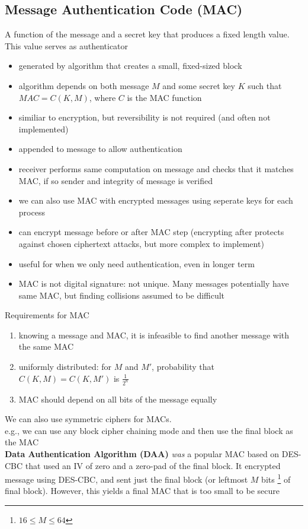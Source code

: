 \documentclass{article}
\begin{document}
\subsection{Message Authentication Code (MAC)}
A function of the message and a secret key that produces a fixed length value. This value serves as authenticator
\begin{itemize}
    \item generated by algorithm that creates a small, fixed-sized block
    \item algorithm depends on both message $M$ and some secret key $K$ such that $MAC = C(K,M)$, where $C$ is the MAC function
    \item similiar to encryption, but reversibility is not required (and often not implemented)
    \item appended to message to allow authentication
    \item receiver performs same computation on message and checks that it matches MAC, if so sender and integrity of message is verified
    \item we can also use MAC with encrypted messages using seperate keys for each process
    \item can encrypt message before or after MAC step (encrypting after protects against chosen ciphertext attacks, but more complex to implement)
    \item useful for when we only need authentication, even in longer term
    \item MAC is not digital signature: not unique. Many messages potentially have same MAC, but finding collisions assumed to be difficult
\end{itemize}
Requirements for MAC
\begin{enumerate}
    \item knowing a message and MAC, it is infeasible to find another message with the same MAC
    \item uniformly distributed: for $M$ and $M'$, probability that $C(K,M) = C(K,M')$ is $\frac{1}{2^n}$
    \item MAC should depend on all bits of the message equally
\end{enumerate}
We can also use symmetric ciphers for MACs.
\\e.g., we can use any block cipher chaining mode and then use the final block as the MAC
\\\textbf{Data Authentication Algorithm (DAA)} \textit{was} a popular MAC based on DES-CBC that used an IV of zero and a zero-pad of the final block. It encrypted message using DES-CBC, and sent just the final block (or leftmost $M$ bits \footnote{$16\leq M \leq 64$} of final block). However, this yields a final MAC that is too small to be secure
\end{document}
